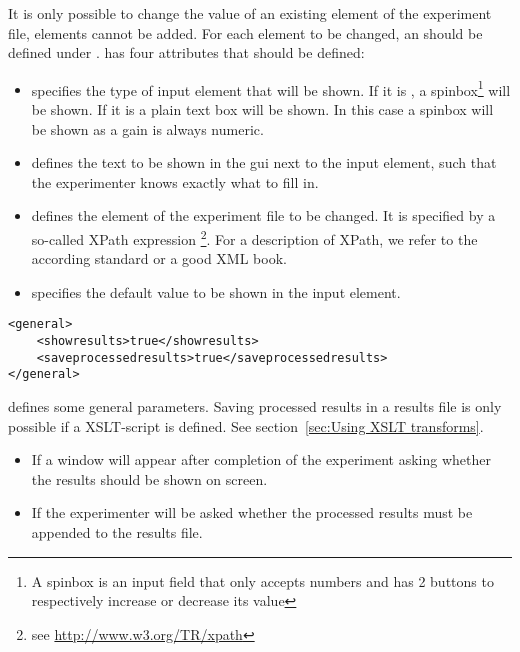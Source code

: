 It is only possible to change the value of an existing element of the experiment file, elements cannot be added. For each element to be changed, an  should be defined under .  has  four attributes that should be defined:

\begin{itemize}
\item {} specifies the type of input element that
will be shown. If it is , a spinbox\footnote{A spinbox is
an input field that only accepts numbers and has 2 buttons to
respectively increase or decrease its value} will be shown. If it
is  a plain text box will be shown. In this case a
spinbox will be shown as a gain is always numeric. \item
{} defines the text to be shown in the
\ac{gui} next to the input element, such that the experimenter
knows exactly what to fill in. \item {}
defines the element of the experiment file to be changed. It is
specified by a so-called XPath expression \footnote{see
\url{http://www.w3.org/TR/xpath}}. For a description of XPath, we
refer to the according standard or a good XML book.

 \item {} specifies the
default value to be shown in the input element.
\end{itemize}

  


\begin{lstlisting}
<general>
    <showresults>true</showresults>
    <saveprocessedresults>true</saveprocessedresults>
</general>
\end{lstlisting}

 defines some general parameters. Saving
processed results in a results file is only possible if a
XSLT-script is defined. See section~\ref{sec:Using XSLT
transforms}.

\begin{itemize}
\item {} If  a window will appear
after completion of the experiment asking whether the results
should be shown on screen.

\item {} If  the
experimenter will be asked whether the processed results must be
appended to the results file.
\end{itemize}

  
